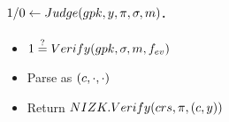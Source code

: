 \paragraph{$1/0 \gets Judge(gpk,y,\pi,\sigma,m)$.} %

\begin{itemize}
\item  $1 \stackrel{?}{=} Verify(gpk,\sigma,m,f_{ev})$
\item Parse \sig as $(c,\cdot,\cdot)$  
\item Return $NIZK.Verify(crs,\pi,(c,y))$
\end{itemize}

